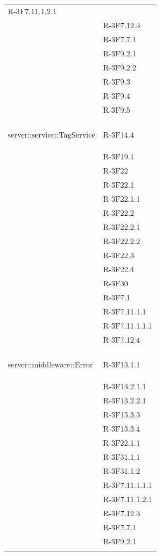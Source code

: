 \begin{longtable}{l p{3cm}}
R-3F7.11.1.2.1 \tabularnewline &

R-3F7.12.3 \tabularnewline &

R-3F7.7.1 \tabularnewline &

R-3F9.2.1 \tabularnewline &

R-3F9.2.2 \tabularnewline &

R-3F9.3 \tabularnewline &

R-3F9.4 \tabularnewline &

R-3F9.5 \tabularnewline &\tabularnewline
\midrule
\hypertarget{server::service::TagService}{server::service::TagService} & R-3F14.4 \tabularnewline &

R-3F19.1 \tabularnewline &

R-3F22 \tabularnewline &

R-3F22.1 \tabularnewline &

R-3F22.1.1 \tabularnewline &

R-3F22.2 \tabularnewline &

R-3F22.2.1 \tabularnewline &

R-3F22.2.2 \tabularnewline &

R-3F22.3 \tabularnewline &

R-3F22.4 \tabularnewline &

R-3F30 \tabularnewline &

R-3F7.1 \tabularnewline &

R-3F7.11.1.1 \tabularnewline &

R-3F7.11.1.1.1 \tabularnewline &

R-3F7.12.4 \tabularnewline &\tabularnewline
\midrule
\hypertarget{server::middleware::Error}{server::middleware::Error} & R-3F13.1.1 \tabularnewline &

R-3F13.2.1.1 \tabularnewline &

R-3F13.2.2.1 \tabularnewline &

R-3F13.3.3 \tabularnewline &

R-3F13.3.4 \tabularnewline &

R-3F22.1.1 \tabularnewline &

R-3F31.1.1 \tabularnewline &

R-3F31.1.2 \tabularnewline &

R-3F7.11.1.1.1 \tabularnewline &

R-3F7.11.1.2.1 \tabularnewline &

R-3F7.12.3 \tabularnewline &

R-3F7.7.1 \tabularnewline &

R-3F9.2.1 \tabularnewline &


\end{longtable}
